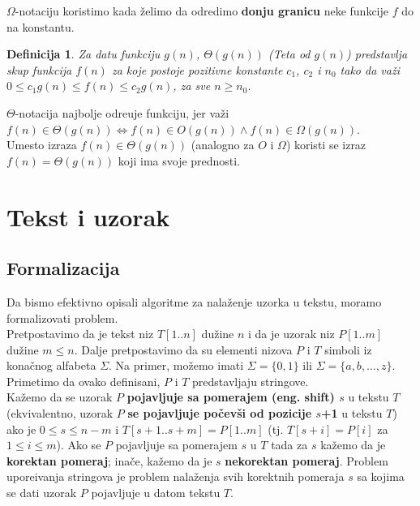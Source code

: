 \documentclass[a4paper,12pt]{article}
\newtheorem{dfn}{Definicija}[section]
\begin{document}
$\Omega$-notaciju koristimo kada \v zelimo da odredimo {\bf donju granicu} neke funkcije $f$ do na konstantu.

\begin{dfn}

Za datu funkciju $g(n)$, $\Theta(g(n))$ (Teta od $g(n)$) predstavlja skup funkcija $f(n)$ za koje postoje pozitivne konstante $c_1$, $c_2$ i $n_0$ tako da va\v zi $0 \leq c_1g(n) \leq f(n) \leq c_2g(n)$, za sve $n \geq n_0$.

\end{dfn}

$\Theta$-notacija najbolje odre\dj uje funkciju, jer va\v zi $f(n) \in \Theta(g(n)) \Leftrightarrow f(n) \in O(g(n)) \wedge f(n) \in \Omega(g(n))$.
\\

Umesto izraza $f(n) \in \Theta(g(n))$ (analogno za $O$ i $\Omega$) koristi se izraz $f(n) = \Theta(g(n))$ koji ima svoje prednosti.

\section{Tekst i uzorak}

\subsection{Formalizacija}

Da bismo efektivno opisali algoritme za nala\v zenje uzorka u tekstu, moramo formalizovati problem.
\\

Pretpostavimo da je tekst niz $T[1..n]$ du\v zine $n$ i da je uzorak niz $P[1..m]$ du\v zine $m \leq n$. Dalje pretpostavimo da su elementi nizova $P$ i $T$ simboli iz kona\v cnog alfabeta $\Sigma$. Na primer, mo\v zemo imati $\Sigma = \{ 0, 1 \}$ ili $\Sigma = \{ a, b, \ldots, z \}$. Primetimo da ovako definisani, $P$ i $T$ predstavljaju stringove.
\\

Ka\v zemo da se uzorak $P$ {\bf pojavljuje sa pomerajem (eng. shift) $s$} u tekstu $T$ (ekvivalentno, uzorak $P$ {\bf se pojavljuje po\v cev\v si od pozicije $s$+1} u tekstu $T$) ako je $0 \leq s \leq n - m$ i $T[s+1..s+m] = P[1..m]$ (tj. $T[s + i] = P[i]$ za $1 \leq i \leq m$). Ako se $P$ pojavljuje sa pomerajem $s$ u $T$ tada za $s$ ka\v zemo da je {\bf korektan pomeraj}; ina\v ce, ka\v zemo da je $s$ {\bf nekorektan pomeraj}. Problem upore\dj ivanja stringova je problem nala\v zenja svih korektnih pomeraja $s$ sa kojima se dati uzorak $P$ pojavljuje u datom tekstu $T$.
\end{document}
